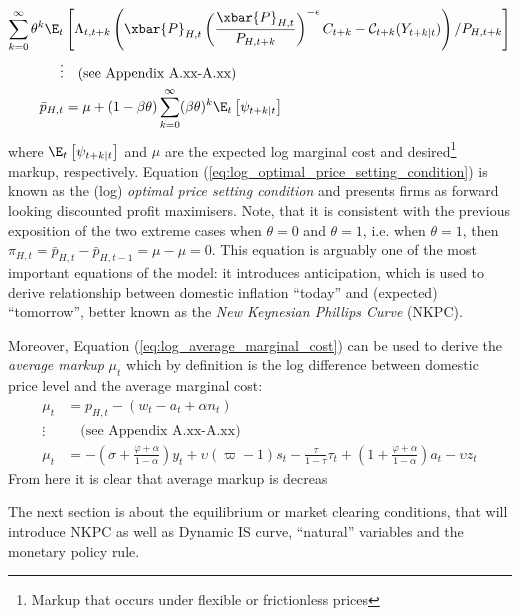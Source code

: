 \begin{align}
    \sum_{k=0}^{\infty} \theta^k \E_t &\left[\Lambda_{t,t+k} \left( \xbar{P}_{H,t} \left(\frac{\xbar{P}_{H,t}}{P_{H,t+k}}\right)^{-\epsilon} C_{t+k} - \mathcal{C}_{t+k}(Y_{t+k|t})\right) / P_{H,t+k} \right] \\
    \vdots & \quad \text{(see Appendix A.xx-A.xx)} \nonumber \\
    \bar{p}_{H,t} &= \mu + (1-\beta \theta) \sum_{k=0}^{\infty} (\beta \theta)^{k} \E_t \left[ \psi_{t+k|t} \right] \label{eq:log_optimal_price_setting_condition}
\end{align}
where $\E_t \left[ \psi_{t+k|t} \right]$ and $\mu$ are the expected log marginal cost and desired\footnote{Markup that occurs under flexible or frictionless prices} markup, respectively. Equation (\ref{eq:log_optimal_price_setting_condition}) is known as the (log) \textit{optimal price setting condition} and presents firms as forward looking discounted profit maximisers. Note, that it is consistent with the previous exposition of the two extreme cases when $\theta = 0$ and $\theta = 1$, i.e. when $\theta = 1$, then $\pi_{H,t} = \bar{p}_{H,t} - \bar{p}_{H,t-1} = \mu - \mu = 0$. This equation is arguably one of the most important equations of the model: it introduces anticipation, which is used to derive relationship between domestic inflation ``today'' and (expected) ``tomorrow'', better known as the \textit{New Keynesian Phillips Curve} (NKPC).

Moreover, Equation (\ref{eq:log_average_marginal_cost}) can be used to derive the \textit{average markup} $\mu_t$ which by definition is the log difference between domestic price level and the average marginal cost:
\begin{align}
    \mu_t &= p_{H,t} - (w_t - a_t + \alpha n_t) \\
    \vdots & \quad \text{(see Appendix A.xx-A.xx)} \nonumber \\
    \mu_t &= -\left(\sigma + \frac{\varphi + \alpha}{1-\alpha}\right)y_t + \upsilon (\varpi - 1) s_t - \frac{\tau}{1-\tau}\tau_t  + \left(1 + \frac{\varphi + \alpha}{1-\alpha}\right)a_t - \upsilon z_t
\end{align}
From here it is clear that average markup is decreas

The next section is about the equilibrium or market clearing conditions, that will introduce NKPC as well as Dynamic IS curve, ``natural'' variables and the monetary policy rule. 